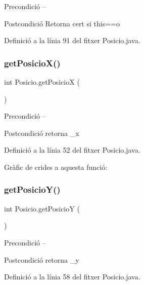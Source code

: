 \begin{DoxyPrecond}{Precondició}
-- 
\end{DoxyPrecond}
\begin{DoxyPostcond}{Postcondició}
Retorna cert si this==o 
\end{DoxyPostcond}


Definició a la línia 91 del fitxer Posicio.\+java.

\mbox{\label{class_posicio_a8a1ae0a7865e6edbf0510ebcf2b97061}} 
\subsubsection{\texorpdfstring{get\+Posicio\+X()}{getPosicioX()}}
{\footnotesize\ttfamily int Posicio.\+get\+PosicioX (\begin{DoxyParamCaption}{ }\end{DoxyParamCaption})}

\begin{DoxyPrecond}{Precondició}
-- 
\end{DoxyPrecond}
\begin{DoxyPostcond}{Postcondició}
retorna \+\_\+x 
\end{DoxyPostcond}


Definició a la línia 52 del fitxer Posicio.\+java.

Gràfic de crides a aquesta funció\+:
\mbox{\label{class_posicio_ae70d63aa90b935131d122fc1e4b72969}} 
\subsubsection{\texorpdfstring{get\+Posicio\+Y()}{getPosicioY()}}
{\footnotesize\ttfamily int Posicio.\+get\+PosicioY (\begin{DoxyParamCaption}{ }\end{DoxyParamCaption})}

\begin{DoxyPrecond}{Precondició}
-- 
\end{DoxyPrecond}
\begin{DoxyPostcond}{Postcondició}
retorna \+\_\+y 
\end{DoxyPostcond}


Definició a la línia 58 del fitxer Posicio.\+java.


